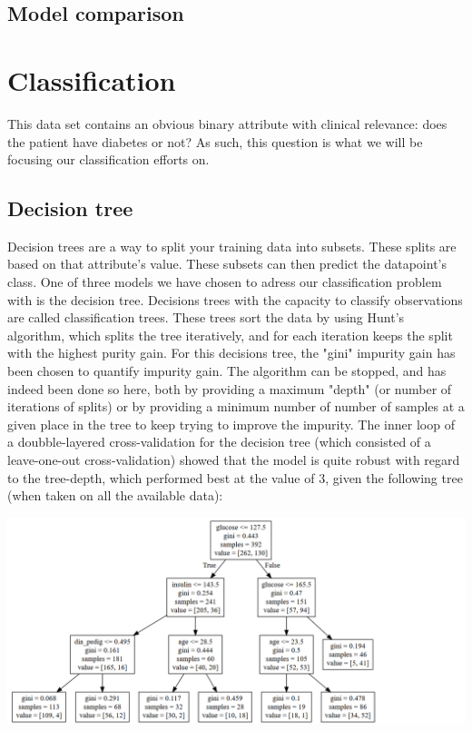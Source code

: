 \subsection{Model comparison}


\section{Classification}

This data set contains an obvious binary attribute
with clinical relevance:
does the patient have diabetes or not?
As such, this question is what we will be
focusing our classification efforts on.

\subsection{Decision tree}
Decision trees are a way to split your training data into subsets. These splits are based on that attribute's value.
These subsets can then predict the datapoint's class.
One of three models we have chosen to adress our classification problem with is the
decision tree. Decisions trees with the capacity to classify observations are called
classification trees. These trees sort the data by using Hunt's algorithm, which
splits the tree iteratively, and for each iteration keeps the split with the
highest purity gain. For this decisions tree, the "gini" impurity gain has been
chosen to quantify impurity gain. The algorithm can be stopped, and has indeed
been done so here, both by providing a maximum "depth" (or number of iterations
of splits) or by providing a minimum number of number of samples at a given
place in the tree to keep trying to improve the impurity.
The inner loop of a doubble-layered cross-validation for the decision tree
(which consisted of a leave-one-out cross-validation) showed
that the model is quite robust with regard to the tree-depth, which performed
best at the value of 3, given the following tree (when taken on all the available
data):

\includegraphics[width=\textwidth]{tree.png}

